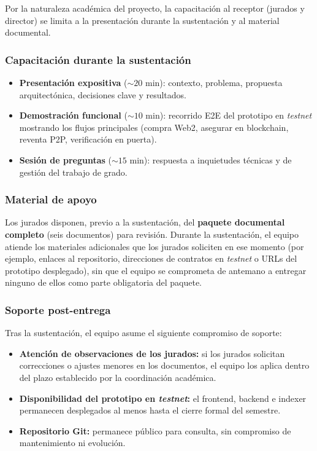 \documentclass[12pt,oneside]{report}
\begin{document}
      Por la naturaleza académica del proyecto, la capacitación al receptor (jurados y director) se limita a la presentación durante la sustentación y al material documental.

      \subsubsection{Capacitación durante la sustentación}
      \begin{itemize}
        \item \textbf{Presentación expositiva} ($\sim 20$ min): contexto, problema, propuesta arquitectónica, decisiones clave y resultados.
        \item \textbf{Demostración funcional} ($\sim 10$ min): recorrido E2E del prototipo en \textit{testnet} mostrando los flujos principales (compra Web2, asegurar en blockchain, reventa P2P, verificación en puerta).
        \item \textbf{Sesión de preguntas} ($\sim 15$ min): respuesta a inquietudes técnicas y de gestión del trabajo de grado.
      \end{itemize}

      \subsubsection{Material de apoyo}
      Los jurados disponen, previo a la sustentación, del \textbf{paquete documental completo} (seis documentos) para revisión. Durante la sustentación, el equipo atiende los materiales adicionales que los jurados soliciten en ese momento (por ejemplo, enlaces al repositorio, direcciones de contratos en \textit{testnet} o URLs del prototipo desplegado), sin que el equipo se comprometa de antemano a entregar ninguno de ellos como parte obligatoria del paquete.

      \subsubsection{Soporte post-entrega}
      Tras la sustentación, el equipo asume el siguiente compromiso de soporte:
      \begin{itemize}
        \item \textbf{Atención de observaciones de los jurados:} si los jurados solicitan correcciones o ajustes menores en los documentos, el equipo los aplica dentro del plazo establecido por la coordinación académica.
        \item \textbf{Disponibilidad del prototipo en \textit{testnet}:} el frontend, backend e indexer permanecen desplegados al menos hasta el cierre formal del semestre.
        \item \textbf{Repositorio Git:} permanece público para consulta, sin compromiso de mantenimiento ni evolución.
      \end{itemize}
\end{document}

